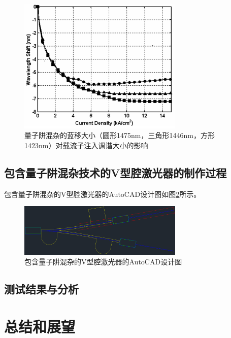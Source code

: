 \documentclass[oneside]{ZJUthesis}
\begin{document}
\begin{figure}[!h]
    \centering
    \includegraphics[width=0.7\textwidth]{./Pictures/qwi_tuning.eps}
    \caption{量子阱混杂的蓝移大小（圆形1475nm，三角形1446nm，方形1423nm）对载流子注入调谐大小的影响}
    \label{fig_qwi_tuning}
\end{figure}

\section{包含量子阱混杂技术的V型腔激光器的制作过程}

包含量子阱混杂的V型腔激光器的AutoCAD设计图如图\ref{fig_vccl_design}所示。

\begin{figure}[!h]
    \centering
    \includegraphics[width=0.7\textwidth]{./Pictures/vccl_design.eps}
    \caption{包含量子阱混杂的V型腔激光器的AutoCAD设计图}
    \label{fig_vccl_design}
\end{figure}

\section{测试结果与分析}

\chapter{总结和展望}
\end{document}
